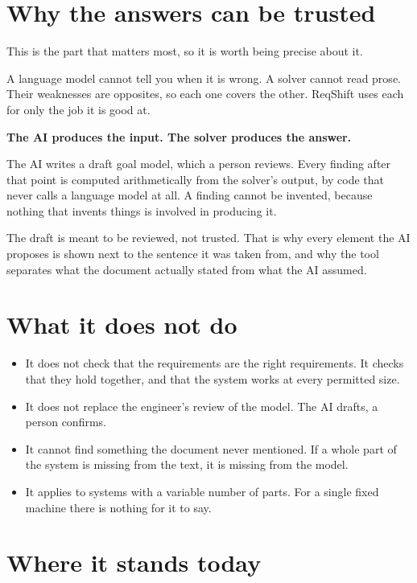 \documentclass[11pt,a4paper]{article}
\begin{document}
\section{Why the answers can be trusted}

This is the part that matters most, so it is worth being precise about it.

A language model cannot tell you when it is wrong. A solver cannot read prose. Their
weaknesses are opposites, so each one covers the other. ReqShift uses each for only
the job it is good at.

\begin{keybox}
\textbf{The AI produces the input. The solver produces the answer.}

The AI writes a draft goal model, which a person reviews. Every finding after that
point is computed arithmetically from the solver's output, by code that never calls a
language model at all. A finding cannot be invented, because nothing that invents
things is involved in producing it.
\end{keybox}

The draft is meant to be reviewed, not trusted. That is why every element the AI
proposes is shown next to the sentence it was taken from, and why the tool separates
what the document actually stated from what the AI assumed.

\section{What it does not do}

\begin{itemize}
  \item It does not check that the requirements are the right requirements. It checks
    that they hold together, and that the system works at every permitted size.
  \item It does not replace the engineer's review of the model. The AI drafts, a
    person confirms.
  \item It cannot find something the document never mentioned. If a whole part of the
    system is missing from the text, it is missing from the model.
  \item It applies to systems with a variable number of parts. For a single fixed
    machine there is nothing for it to say.
\end{itemize}

\section{Where it stands today}
\end{document}

